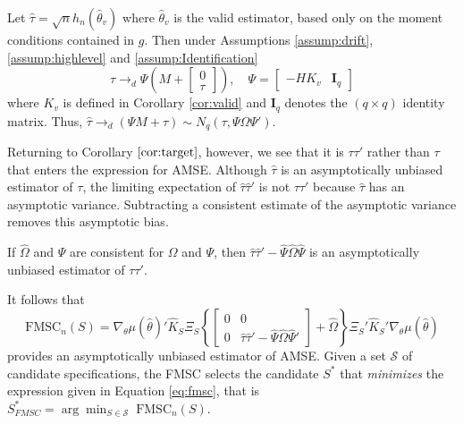 \begin{thm} 
\label{thm:tau}
Let $\widehat{\tau} = \sqrt{n} h_n(\widehat{\theta}_v)$ where $\widehat{\theta}_v$ is the valid estimator, based only on the moment conditions contained in $g$. 
Then under Assumptions \ref{assump:drift}, \ref{assump:highlevel} and \ref{assump:Identification}
$$\widehat{\tau} \rightarrow_d \Psi\left( M + \left[\begin{array}
	{c} 0 \\ \tau
\end{array} \right]\right), \quad \Psi = \left[\begin{array}{cc} -HK_v & \mathbf{I}_q \end{array}\right]$$ 
where $K_v$ is defined in Corollary \ref{cor:valid} and $\mathbf{I}_q$ denotes the $(q\times q)$ identity matrix.
Thus, $\widehat{\tau}\rightarrow_d (\Psi M + \tau) \sim N_q(\tau, \Psi \Omega \Psi')$.
\end{thm}

Returning to Corollary $\ref{cor:target}$, however, we see that it is $\tau \tau'$ rather than $\tau$ that enters the expression for AMSE. 
Although $\widehat{\tau}$ is an asymptotically unbiased estimator of $\tau$, the limiting expectation of $\widehat{\tau} \widehat{\tau}'$ is not $\tau\tau'$ because $\widehat{\tau}$ has an asymptotic variance.  
Subtracting a consistent estimate of the asymptotic variance removes this asymptotic bias.

\begin{cor}
\label{cor:tautau}
If $\widehat{\Omega}$ and $\widehat{\Psi}$ are consistent for $\Omega$ and $\Psi$, then $ \widehat{\tau}\widehat{\tau}' - \widehat{\Psi}\widehat{\Omega}\widehat{\Psi}$ is an asymptotically unbiased estimator of $\tau\tau'$.
\end{cor}
It follows that
\begin{equation}
\label{eq:fmsc}
	\mbox{FMSC}_n(S) = \nabla_\theta\mu(\widehat{\theta})'\widehat{K}_S\Xi_S \left\{\left[\begin{array}{cc}0&0\\0&\widehat{\tau}\widehat{\tau}' - \widehat{\Psi}\widehat{\Omega}\widehat{\Psi}'\end{array}\right] + \widehat{\Omega}\right\}\Xi_S'\widehat{K}_S' \nabla_\theta\mu(\widehat{\theta})
\end{equation}
provides an asymptotically unbiased estimator of AMSE.
Given a set $\mathscr{S}$ of candidate specifications, the FMSC selects the candidate $S^*$ that \emph{minimizes} the expression given in Equation \ref{eq:fmsc}, that is $S^*_{FMSC} =  \arg \min_{S\in \mathscr{S}} \;\mbox{FMSC}_n(S)$.

